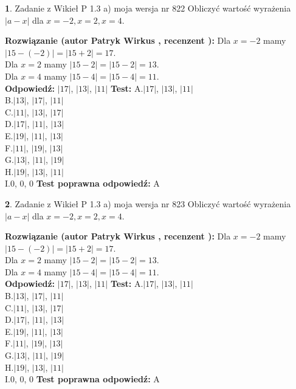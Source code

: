 \documentclass[12pt, a4paper]{article}
\theoremstyle{definition} %
\newtheorem{zad}{}
\newcommand{\zadStart}[1]{\begin{zad}#1\newline}
\newcommand{\zadStop}{\end{zad}}
\newcommand{\rozwStart}[2]{\noindent \textbf{Rozwiązanie (autor #1 , recenzent #2): }\newline}
\newcommand{\rozwStop}{\newline}
\newcommand{\odpStart}{\noindent \textbf{Odpowiedź:}\newline}
\newcommand{\odpStop}{\newline}
\newcommand{\testStart}{\noindent \textbf{Test:}\newline}
\newcommand{\testStop}{\newline}
\newcommand{\kluczStart}{\noindent \textbf{Test poprawna odpowiedź:}\newline}
\newcommand{\kluczStop}{\newline}
\begin{document}
\zadStart{Zadanie z Wikieł P 1.3 a) moja wersja nr 822}
Obliczyć wartość wyrażenia $|a - x|$ dla $x=-2,x=2,x=4$.
\zadStop
\rozwStart{Patryk Wirkus}{}
Dla $x = -2$ mamy $|15 - (-2)| = |15 + 2| = 17$.\\
Dla $x = 2$ mamy $|15 - 2| = |15 - 2| = 13$.\\
Dla $x = 4$ mamy $|15 - 4| = |15 - 4| = 11$.\\
\rozwStop
\odpStart
$|17|$, $|13|$, $|11|$
\odpStop
\testStart
A.$|17|$, $|13|$, $|11|$\\
B.$|13|$, $|17|$, $|11|$\\
C.$|11|$, $|13|$, $|17|$\\
D.$|17|$, $|11|$, $|13|$\\
E.$|19|$, $|11|$, $|13|$\\
F.$|11|$, $|19|$, $|13|$\\
G.$|13|$, $|11|$, $|19|$\\
H.$|19|$, $|13|$, $|11|$\\
I.$0$, $0$, $0$
\testStop
\kluczStart
A
\kluczStop



\zadStart{Zadanie z Wikieł P 1.3 a) moja wersja nr 823}
Obliczyć wartość wyrażenia $|a - x|$ dla $x=-2,x=2,x=4$.
\zadStop
\rozwStart{Patryk Wirkus}{}
Dla $x = -2$ mamy $|15 - (-2)| = |15 + 2| = 17$.\\
Dla $x = 2$ mamy $|15 - 2| = |15 - 2| = 13$.\\
Dla $x = 4$ mamy $|15 - 4| = |15 - 4| = 11$.\\
\rozwStop
\odpStart
$|17|$, $|13|$, $|11|$
\odpStop
\testStart
A.$|17|$, $|13|$, $|11|$\\
B.$|13|$, $|17|$, $|11|$\\
C.$|11|$, $|13|$, $|17|$\\
D.$|17|$, $|11|$, $|13|$\\
E.$|19|$, $|11|$, $|13|$\\
F.$|11|$, $|19|$, $|13|$\\
G.$|13|$, $|11|$, $|19|$\\
H.$|19|$, $|13|$, $|11|$\\
I.$0$, $0$, $0$
\testStop
\kluczStart
A
\kluczStop
\end{document}
